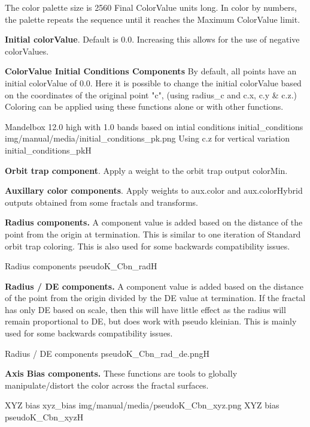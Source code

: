 The color palette size is 2560 Final ColorValue units long. In color by numbers, the palette repeats the sequence until it reaches the Maximum ColorValue limit.

\textbf{Initial colorValue}. Default is 0.0. Increasing this allows for the use of negative colorValues.

\textbf{ColorValue Initial Conditions Components}
By default, all points have an initial colorValue of 0.0. Here it is possible to change the initial colorValue based on the coordinates of the original point "c", (using radius\_c and c.x, c.y \& c.z.) Coloring can be applied using these functions alone or with other functions.

{Mandelbox 12.0 high with 1.0 bands based on intial conditions}
{initial_conditions}
{img/manual/media/initial_conditions_pk.png}
{Using c.z for vertical variation}
{initial_conditions_pk}{H}

\textbf{Orbit trap component}. Apply a weight to the orbit trap output colorMin.

\textbf{Auxillary color components}. Apply weights to aux.color and aux.colorHybrid outputs obtained from some fractals and transforms.

\textbf{Radius components.} A component value is added based on the distance of the point from the origin at termination.
This is similar to one iteration of Standard orbit trap coloring. This is also used for some backwards compatibility issues.

{Radius components}
{pseudoK_Cbn_rad}{H}

\textbf{Radius / DE components.} A component value is added based on the distance of the point from the origin divided by the DE value at termination. If the fractal has only DE based on scale, then this will have little effect as the radius will remain proportional to DE, but does work with pseudo kleinian. This is mainly used for some backwards compatibility issues.

{Radius / DE components}
{pseudoK_Cbn_rad_de.png}{H}

\textbf{Axis Bias components.} These functions are tools to globally manipulate/distort the color across the fractal surfaces.
 
{XYZ bias}
{xyz_bias}
{img/manual/media/pseudoK_Cbn_xyz.png}
{XYZ bias}
{pseudoK_Cbn_xyz}{H}

